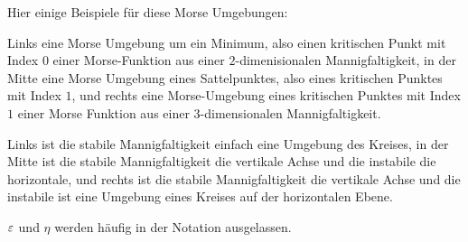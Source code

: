 \begin{definition}
    Hier einige Beispiele für diese Morse Umgebungen:


    Links eine Morse Umgebung um ein Minimum, also einen kritischen Punkt mit Index $0$ einer 
    Morse-Funktion aus einer $2$-dimenisionalen Mannigfaltigkeit, in der Mitte eine Morse Umgebung 
    eines Sattelpunktes, also eines kritischen Punktes mit Index $1$, und rechts eine Morse-Umgebung 
    eines kritischen Punktes mit Index $1$ einer Morse Funktion aus einer $3$-dimensionalen 
    Mannigfaltigkeit.

    Links ist die stabile Mannigfaltigkeit einfach eine Umgebung des Kreises, in der Mitte ist die 
    stabile Mannigfaltigkeit die vertikale Achse und die instabile die horizontale, und rechts
    ist die stabile Mannigfaltigkeit die vertikale Achse und die instabile ist eine Umgebung 
    eines Kreises auf der horizontalen Ebene.
    
    $\varepsilon$ und $\eta$ werden häufig in der Notation ausgelassen.
\end{definition}

